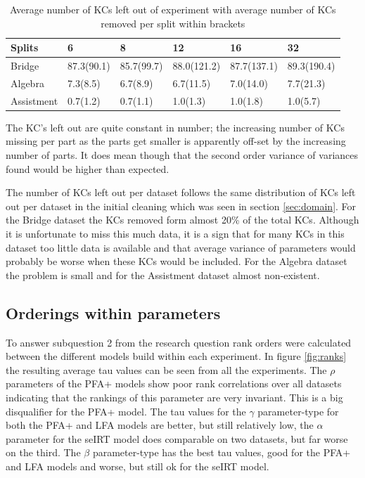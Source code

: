 \documentclass{scrartcl}
\begin{document}
\begin{center}
\begin{table}[!htbp]
\begin{tabular}{| l | l|l|l|l|l|}

    \hline
    Splits & 6  & 8 & 12 & 16 & 32 \\ \hline
    Bridge &  87.3(90.1)& 85.7(99.7)& 88.0(121.2)& 87.7(137.1)& 89.3(190.4) \\ \hline
    Algebra & 7.3(8.5)& 6.7(8.9)& 6.7(11.5)& 7.0(14.0)& 7.7(21.3) \\ \hline
    Assistment & 0.7(1.2)& 0.7(1.1)& 1.0(1.3)& 1.0(1.8)& 1.0(5.7) \\ \hline

\end{tabular}
\caption{Average number of KCs left out of experiment with average number of KCs removed per split within brackets}
\label{tab:kcmis}
\end{table}
\end{center}

The KC's left out are quite constant in number; the increasing number of KCs missing per part as the parts get smaller is apparently off-set by the increasing number of parts. It does mean though that the second order variance of variances found would be higher than expected.

The number of KCs left out per dataset follows the same distribution of KCs left out per dataset in the initial cleaning which was seen in section \ref{sec:domain}. For the Bridge dataset the KCs removed form almost 20\% of the total KCs. Although it is unfortunate to miss this much data, it is a sign that for many KCs in this dataset too little data is available and that average variance of parameters would probably be worse when these KCs would be included. For the Algebra dataset the problem is small and for the Assistment dataset almost non-existent.

\subsection{Orderings within parameters}
To answer subquestion 2 from the research question rank orders were calculated between the different models build within each experiment. In figure \ref{fig:ranks} the resulting average tau values can be seen from all the experiments. The $\rho$ parameters of the PFA+ models show poor rank correlations over all datasets indicating that the rankings of this parameter are very invariant. This is a big disqualifier for the PFA+ model.
The tau values for the $\gamma$ parameter-type for both the PFA+ and LFA models are better, but still relatively low, the $\alpha$ parameter for the seIRT model does comparable on two datasets, but far worse on the third.
The $\beta$ parameter-type has the best tau values, good for the PFA+ and LFA models and worse, but still ok for the seIRT model.
\end{document}
